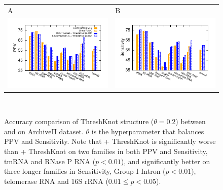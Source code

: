 \iftrue
\begin{figure}[h]
  \centering
\begin{tabular}{ll}
{\large\sf A} & {\large\sf B}\\[-1cm]
    \includegraphics[width=.45\textwidth]{figs/new_ThreshKnot_vs_MFE_PPV_LPC}
    &
    \hspace{-0.1cm}
    \includegraphics[width=.45\textwidth]{figs/new_ThreshKnot_vs_MFE_sens_LPC}
  \end{tabular} \\[-0.5cm]
  \caption{Accuracy comparison of ThreshKnot structure ($\theta=0.2$) between \contrafold and \linearpartitionc on ArchiveII dataset. $\theta$ is the hyperparameter that balances PPV and Sensitivity. Note that \linearpartitionc + ThreshKnot is significantly worse than \contrafold + ThreshKnot on two families in both PPV and Sensitivity, tmRNA and RNase P RNA ($p < 0.01$), and significantly better on three longer families in Sensitivity, Group I Intron ($p < 0.01$), telomerase RNA and 16S rRNA ($0.01 \leq p < 0.05$).
  \label{fig:threshknot_lpc}}
\end{figure}
\fi



